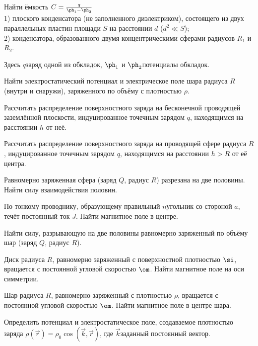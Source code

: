 \documentclass[a4paper,draft]{article}
\begin{document}
\begin{nums}{-2}
\item Найти ёмкость $C = \frac{q}{\ph_1-\ph_2}$\\
1) плоского конденсатора (не заполненного диэлектриком), состоящего из двух параллельных пластин
площади $S$ на расстоянии $d$ ($d^2 \ll S$);\\
2) конденсатора, образованного двумя концентрическими сферами радиусов $R_1$ и $R_2$.

Здесь $q$\т заряд одной из обкладок, $\ph_1$ и $\ph_2$\т потенциалы обкладок.

\item Найти электростатический потенциал и электрическое поле шара радиуса $R$ (внутри и снаружи),
заряженного по объёму с плотностью $\rho$.

\item Рассчитать распределение поверхностного заряда на бесконечной проводящей заземлённой
плоскости, индуцированное точечным зарядом $q$, находящимся на расстоянии $h$ от неё.

\item Рассчитать распределение поверхностного заряда на проводящей сфере радиуса $R$,
индуцированное точечным зарядом $q$, находящимся на расстоянии $h > R$ от её центра.

\item Равномерно заряженная сфера (заряд $Q$, радиус $R$) разрезана на две половины.
Найти силу взаимодействия половин.

\item По тонкому проводнику, образующему правильный $n$\д угольник со стороной $a$, течёт постоянный ток $J$.
Найти магнитное поле в центре.

\item Найти силу, разрывающую на две половины равномерно заряженный по объёму шар (заряд $Q$, радиус $R$).

\item Диск радиуса $R$, равномерно заряженный с поверхностной плотностью $\si$, вращается с постоянной
угловой скоростью $\om$. Найти магнитное поле на оси симметрии.

\item Шар радиуса $R$, равномерно заряженный с плотностью $\rho$, вращается с постоянной
угловой скоростью $\om$. Найти магнитное поле в центре шара.

\item Определить потенциал и электростатическое поле, создаваемое плотностью заряда $\rho(\vec r) = \rho_0 \cos(\vec k, \vec r)$,
где $\vec k$\т заданный постоянный вектор.


\end{nums}
\end{document}
